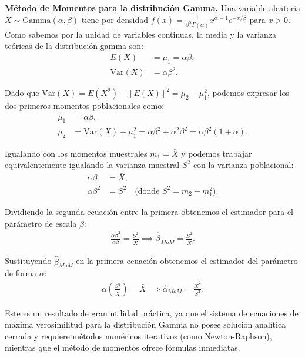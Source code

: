 \begin{ejemplo}
	\textbf{Método de Momentos para la distribución Gamma.}
	Una variable aleatoria $X \sim \text{Gamma}(\alpha, \beta)$ tiene por densidad $f(x) = \frac{1}{\beta^\alpha \Gamma(\alpha)} x^{\alpha-1} e^{-x/\beta}$ para $x > 0$. Como sabemos por la unidad de variables continuas, la media y la varianza teóricas de la distribución gamma son:
	\begin{align}
		E(X) &= \mu_1 = \alpha\beta, \\
		\text{Var}(X) &= \alpha\beta^2.
	\end{align}

	Dado que $\text{Var}(X) = E(X^2) - [E(X)]^2 = \mu_2 - \mu_1^2$, podemos expresar los dos primeros momentos poblacionales como:
	\begin{align}
		\mu_1 &= \alpha\beta, \\
		\mu_2 &= \text{Var}(X) + \mu_1^2 = \alpha\beta^2 + \alpha^2\beta^2 = \alpha\beta^2(1 + \alpha).
	\end{align}

	Igualando con los momentos muestrales $m_1 = \bar{X}$ y podemos trabajar equivalentemente igualando la varianza muestral $S^2$ con la varianza poblacional:
	\begin{align}
		\alpha\beta &= \bar{X}, \\
		\alpha\beta^2 &= S^2 \quad \text{(donde } S^2 = m_2 - m_1^2 \text{)}.
	\end{align}

	Dividiendo la segunda ecuación entre la primera obtenemos el estimador para el parámetro de escala $\beta$:
	\begin{align}
		\frac{\alpha\beta^2}{\alpha\beta} = \frac{S^2}{\bar{X}} \implies \hat{\beta}_{MoM} = \frac{S^2}{\bar{X}}.
	\end{align}

	Sustituyendo $\hat{\beta}_{MoM}$ en la primera ecuación obtenemos el estimador del parámetro de forma $\alpha$:
	\begin{align}
		\alpha \left( \frac{S^2}{\bar{X}} \right) = \bar{X} \implies \hat{\alpha}_{MoM} = \frac{\bar{X}^2}{S^2}.
	\end{align}

	Este es un resultado de gran utilidad práctica, ya que el sistema de ecuaciones de máxima verosimilitud para la distribución Gamma no posee solución analítica cerrada y requiere métodos numéricos iterativos (como Newton-Raphson), mientras que el método de momentos ofrece fórmulas inmediatas.
\end{ejemplo}

